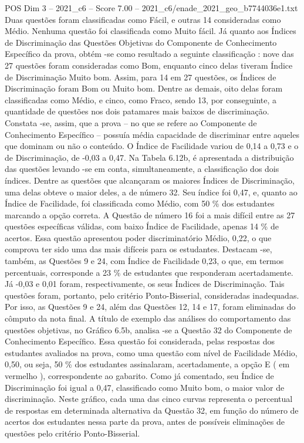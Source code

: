 \begin{textsample}{POS Dim 3 – 2021\_c6 – Score 7.00 – 2021\_c6/enade\_2021\_geo\_b7744036e1.txt}
Duas questões foram classificadas como Fácil, e outras 14 consideradas como Médio.
Nenhuma questão foi classificada como Muito fácil.
Já quanto aos Índices de Discriminação das Questões Objetivas do Componente de Conhecimento Específico da prova, obtém -se como resultado a seguinte classificação : nove das 27 questões foram consideradas como Bom, enquanto cinco delas tiveram Índice de Discriminação Muito bom.
Assim, para 14 em 27 questões, os Índices de Discriminação foram Bom ou Muito bom.
Dentre as demais, oito delas foram classificadas como Médio, e cinco, como Fraco, sendo 13, por conseguinte, a quantidade de questões nos dois patamares mais baixos de discriminação.
Constata -se, assim, que a prova – no que se refere ao Componente de Conhecimento Específico – possuía média capacidade de discriminar entre aqueles que dominam ou não o conteúdo.
O Índice de Facilidade variou de 0,14 a 0,73 e o de Discriminação, de -0,03 a 0,47.
Na Tabela 6.12b, é apresentada a distribuição das questões levando -se em conta, simultaneamente, a classificação dos dois índices.
Dentre as questões que alcançaram os maiores Índices de Discriminação, uma delas obteve o maior deles, a de número 32.
Seu índice foi 0,47, e, quanto ao Índice de Facilidade, foi classificada como Médio, com 50 \% dos estudantes marcando a opção correta.
A Questão de número 16 foi a mais difícil entre as 27 questões específicas válidas, com baixo Índice de Facilidade, apenas 14 \% de acertos.
Essa questão apresentou poder discriminatório Médio, 0,22, o que comprova ter sido uma das mais difíceis para os estudantes.
Destacam -se, também, as Questões 9 e 24, com Índice de Facilidade 0,23, o que, em termos percentuais, corresponde a 23 \% de estudantes que responderam acertadamente.
Já -0,03 e 0,01 foram, respectivamente, os seus Índices de Discriminação.
Tais questões foram, portanto, pelo critério Ponto-Bisserial, consideradas inadequadas.
Por isso, as Questões 9 e 24, além das Questões 12, 14 e 17, foram eliminadas do cômputo da nota final.
A título de exemplo das análises do comportamento das questões objetivas, no Gráfico 6.5b, analisa -se a Questão 32 do Componente de Conhecimento Específico.
Essa questão foi considerada, pelas respostas dos estudantes avaliados na prova, como uma questão com nível de Facilidade Médio, 0,50, ou seja, 50 \% dos estudantes assinalaram, acertadamente, a opção E ( em vermelho ), correspondente ao gabarito.
Como já comentado, seu Índice de Discriminação foi igual a 0,47, classificado como Muito bom, o maior valor de discriminação.
Neste gráfico, cada uma das cinco curvas representa o percentual de respostas em determinada alternativa da Questão 32, em função do número de acertos dos estudantes nessa parte da prova, antes de possíveis eliminações de questões pelo critério Ponto-Bisserial.

\end{textsample}

